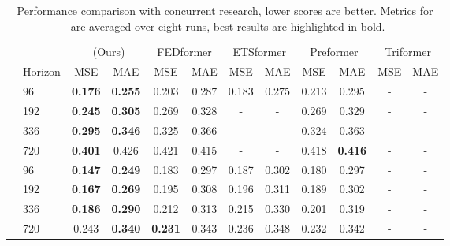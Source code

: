 \begin{table}[ht!]
\scriptsize
    \begin{center}
    \caption{Performance comparison with concurrent research, lower scores are better. Metrics for \ours\ are averaged over eight runs, best results are highlighted in bold.}
    \label{table:main_results_multivar_concurrent}    
	\begin{tabular}{ll | cccccccccc} \toprule
	&     & \multicolumn{2}{c}{\ours\ (Ours)}  & \multicolumn{2}{c}{FEDformer} & \multicolumn{2}{c}{ETSformer} & \multicolumn{2}{c}{Preformer} & \multicolumn{2}{c}{Triformer} \\
    &  Horizon & MSE        & MAE             & MSE            & MAE          & MSE             & MAE             & MSE        & MAE              & MSE         & MAE     \\ \midrule
\parbox[t]{0.2mm}{}
	& 96  & \textbf{0.176}  & \textbf{0.255}  & 0.203          & 0.287          & 0.183           & 0.275           & 0.213      & 0.295            & -           & -     \\
	& 192 & \textbf{0.245}  & \textbf{0.305}  & 0.269          & 0.328          & -               & -               & 0.269      & 0.329            & -           & -     \\
	& 336 & \textbf{0.295}  & \textbf{0.346}  & 0.325          & 0.366          & -               & -               & 0.324      & 0.363            & -           & -     \\
	& 720 & \textbf{0.401}  & 0.426           & 0.421          & 0.415          & -               & -               & 0.418      & \textbf{0.416}   & -           & -     \\ \midrule
\parbox[t]{0.2mm}{}
	& 96  & \textbf{0.147}  & \textbf{0.249}  & 0.183          & 0.297          & 0.187           & 0.302           & 0.180      & 0.297            & -           & -     \\
	& 192 & \textbf{0.167}  & \textbf{0.269}  & 0.195          & 0.308          & 0.196           & 0.311           & 0.189      & 0.302            & -           & -     \\
	& 336 & \textbf{0.186}  & \textbf{0.290}  & 0.212          & 0.313          & 0.215           & 0.330           & 0.201      & 0.319            & -           & -     \\
	& 720 & 0.243           & \textbf{0.340}  & \textbf{0.231} & 0.343          & 0.236           & 0.348           & 0.232      & 0.342            & -           & -     \\ \midrule

\end{tabular}
\end{center}
\end{table}
